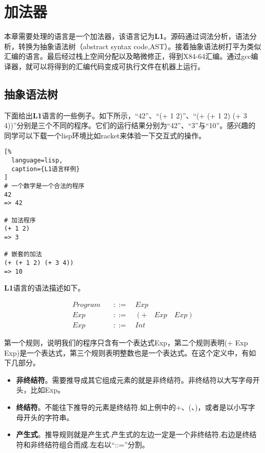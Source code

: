 \chapter{加法器}

本章需要处理的语言是一个加法器，该语言记为\textbf{L1}。源码通过词法分析，语法分析，转换为抽象语法树（abstract syntax code,AST）。接着抽象语法树打平为类似汇编的语言。最后经过栈上空间分配以及略微修正，得到X84-64汇编。通过gcc编译器，就可以将得到的汇编代码变成可执行文件在机器上运行。

\section{抽象语法树}

下面给出\textbf{L1}语言的一些例子。如下所示，“42”、“(+ 1 2)”、“(+ (+ 1 2) (+ 3 4))”分别是三个不同的程序。它们的运行结果分别为“42”、“3”与“10”。感兴趣的同学可以下载一个lisp环境比如racket来体验一下交互式的操作。

\begin{lstlisting}[%
  language=lisp,
  caption={L1语言样例}
]
# 一个数字是一个合法的程序
42
=> 42

# 加法程序
(+ 1 2)
=> 3

# 嵌套的加法
(+ (+ 1 2) (+ 3 4))
=> 10
\end{lstlisting}


\textbf{L1}语言的语法描述如下。

\begin{equation}
\begin{aligned}
  \label{eq:1}
   Program \quad &::= \quad Exp \\
   Exp \quad &::= \quad (+ \quad Exp \quad Exp) \\
   Exp \quad &::=  \quad Int
\end{aligned}
\end{equation}

第一个规则，说明我们的程序只含有一个表达式Exp，第二个规则表明(+ Exp Exp)是一个表达式，第三个规则表明整数也是一个表达式。在这个定义中，有如下几部分。

\begin{itemize}
  \item \textbf{非终结符}。需要推导成其它组成元素的就是非终结符。非终结符以大写字母开头，比如Exp。
  \item \textbf{终结符}。不能往下推导的元素是终结符.如上例中的+、(、)，或者是以小写字母开头的字符串。
  \item \textbf{产生式}。推导规则就是产生式.产生式的左边一定是一个非终结符,右边是终结符和非终结符组合而成.左右以“::=”分割。
\end{itemize}


